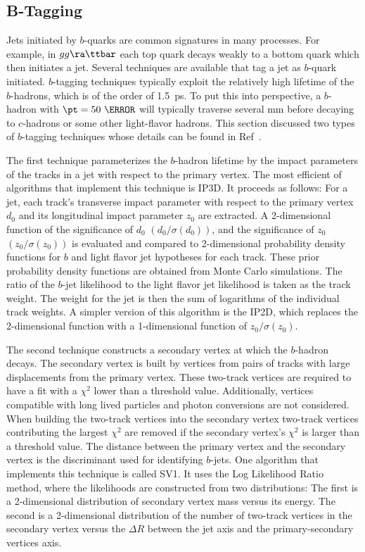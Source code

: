 \subsection{B-Tagging}
\label{sec:bTag}
\par Jets initiated by $b$-quarks are common signatures 
in many processes. For example, in $gg\ra\ttbar$ each 
top quark decays weakly to a bottom quark which then initiates a jet. Several techniques are 
available that tag a jet as $b$-quark initiated. 
$b$-tagging techniques typically exploit the relatively high lifetime 
of the $b$-hadrons, which is of the order of \SI{1.5}{\pico\s}. To put this into perspective, a $b$-hadron 
with $\pt=50~\GeV$ will typically traverse several mm before decaying to $c$-hadrons 
or some other light-flavor hadrons. This section discussed two types of 
$b$-tagging techniques whose details can be found in Ref~\cite{Aad:2015ydr}. 

\par The first technique parameterizes the $b$-hadron lifetime by the impact parameters 
of the tracks in a jet with respect to the primary vertex. The most efficient of algorithms 
that implement this technique is IP3D. It proceeds as follows: For a jet, each track's transverse 
impact parameter with respect to the primary vertex $d_0$ and its longitudinal impact parameter $z_0$
are extracted. A 2-dimensional function of the significance of $d_0$ $(d_0/\sigma(d_0))$, and the 
significance of $z_0$ $(z_0/\sigma(z_0))$ is evaluated and compared to 2-dimensional probability density functions 
for $b$ and light flavor jet hypotheses for each track. These prior probability 
density functions are obtained from Monte Carlo simulations. The ratio of the $b$-jet likelihood to the 
light flavor jet likelihood is taken as the track weight. The weight for the jet is then the 
sum of logarithms of the individual track weights. A simpler version of this algorithm 
is the IP2D, which replaces the 2-dimensional function with a 1-dimensional function of $z_0/\sigma(z_0)$.

\par The second technique constructs a secondary vertex at which the $b$-hadron decays.
The secondary vertex is built by vertices from pairs of tracks with large displacements from the 
primary vertex. These two-track vertices are required to have a fit with a $\chi^2$ lower than a threshold value. 
Additionally, vertices compatible with long lived particles and photon conversions are not considered. 
When building the two-track vertices into the secondary vertex two-track vertices contributing 
the largest $\chi^2$ are removed if the secondary vertex's $\chi^2$ is larger than a threshold value. 
The distance between the primary vertex and the secondary vertex is the discriminant used for 
identifying $b$-jets. One algorithm that implements this technique is called SV1. It uses the 
Log Likelihood Ratio method, where the likelihoods are constructed from two distributions: The 
first is a 2-dimensional distribution of secondary vertex mass versus its energy. The second is 
a 2-dimensional distribution of the number of two-track vertices in the secondary vertex versus 
the $\Delta R$ between the jet axis and the primary-secondary vertices axis.  


